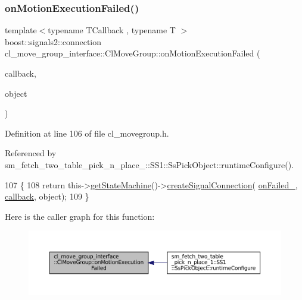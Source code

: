 \subsubsection{\texorpdfstring{on\+Motion\+Execution\+Failed()}{onMotionExecutionFailed()}}
{\footnotesize\ttfamily template$<$typename T\+Callback , typename T $>$ \\
boost\+::signals2\+::connection cl\+\_\+move\+\_\+group\+\_\+interface\+::\+Cl\+Move\+Group\+::on\+Motion\+Execution\+Failed (\begin{DoxyParamCaption}\item[{T\+Callback}]{callback,  }\item[{T $\ast$}]{object }\end{DoxyParamCaption})\hspace{0.3cm}{\ttfamily [inline]}}



Definition at line 106 of file cl\+\_\+movegroup.\+h.



Referenced by sm\+\_\+fetch\+\_\+two\+\_\+table\+\_\+pick\+\_\+n\+\_\+place\+\_\+::\+S\+S1\+::\+Ss\+Pick\+Object\+::runtime\+Configure().


\begin{DoxyCode}
107   \{
108     \textcolor{keywordflow}{return} this->\hyperlink{classsmacc_1_1ISmaccClient_aec51d4712404cb9882b86e4c854bb93a}{getStateMachine}()->\hyperlink{classsmacc_1_1ISmaccStateMachine_adf0f42ade0c65cc471960fe2a7c42da2}{createSignalConnection}(
      \hyperlink{classcl__move__group__interface_1_1ClMoveGroup_a3e0ea6acf70a0c527864b712b215033b}{onFailed\_}, \hyperlink{sm__ridgeback__barrel__search__1_2servers_2opencv__perception__node_2opencv__perception__node_8cpp_a050e697bd654facce10ea3f6549669b3}{callback}, \textcolor{keywordtype}{object});
109   \}
\end{DoxyCode}
Here is the caller graph for this function\+:
\nopagebreak
\begin{figure}[H]
\begin{center}
\leavevmode
\includegraphics[width=350pt]{classcl__move__group__interface_1_1ClMoveGroup_a6a18da445eb780d3099a94d685143295_icgraph}
\end{center}
\end{figure}
\mbox{\label{classcl__move__group__interface_1_1ClMoveGroup_a6aa372d095e82775a04f41cdcf029cf2}} 
